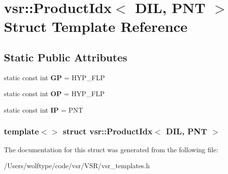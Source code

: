 \hypertarget{structvsr_1_1_product_idx_3_01_d_i_l_00_01_p_n_t_01_4}{\section{vsr\-:\-:Product\-Idx$<$ D\-I\-L, P\-N\-T $>$ Struct Template Reference}
\label{structvsr_1_1_product_idx_3_01_d_i_l_00_01_p_n_t_01_4}
}
\subsection*{Static Public Attributes}
\begin{DoxyCompactItemize}
\item 
\hypertarget{structvsr_1_1_product_idx_3_01_d_i_l_00_01_p_n_t_01_4_a34cb0773d3a0074edd8c23d07f46c0fc}{static const int {\bfseries G\-P} = H\-Y\-P\-\_\-\-F\-L\-P}\label{structvsr_1_1_product_idx_3_01_d_i_l_00_01_p_n_t_01_4_a34cb0773d3a0074edd8c23d07f46c0fc}

\item 
\hypertarget{structvsr_1_1_product_idx_3_01_d_i_l_00_01_p_n_t_01_4_a91ec4135f88ba581a8fdd51cb3a2539c}{static const int {\bfseries O\-P} = H\-Y\-P\-\_\-\-F\-L\-P}\label{structvsr_1_1_product_idx_3_01_d_i_l_00_01_p_n_t_01_4_a91ec4135f88ba581a8fdd51cb3a2539c}

\item 
\hypertarget{structvsr_1_1_product_idx_3_01_d_i_l_00_01_p_n_t_01_4_ad63bc420fa455c583b0d7fe2fe75b245}{static const int {\bfseries I\-P} = P\-N\-T}\label{structvsr_1_1_product_idx_3_01_d_i_l_00_01_p_n_t_01_4_ad63bc420fa455c583b0d7fe2fe75b245}

\end{DoxyCompactItemize}
\subsubsection*{template$<$$>$ struct vsr\-::\-Product\-Idx$<$ D\-I\-L, P\-N\-T $>$}



The documentation for this struct was generated from the following file\-:\begin{DoxyCompactItemize}
\item 
/\-Users/wolftype/code/vsr/\-V\-S\-R/vsr\-\_\-templates.\-h\end{DoxyCompactItemize}
